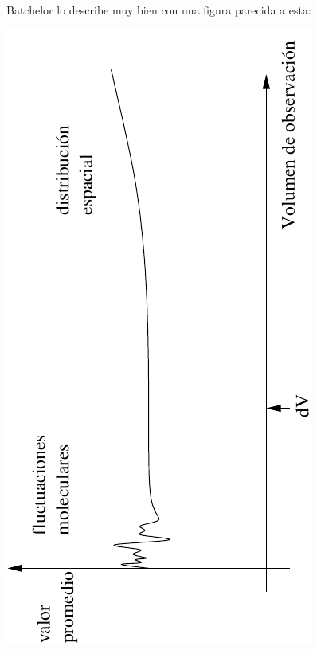 Batchelor \cite{Batchelor1997} lo describe muy bien con una figura parecida a esta:
\begin{center}
\includegraphics[scale=1,angle=270]{TeX_files/chapter01-Introduccion/difer_vol.pdf}
\end{center}

